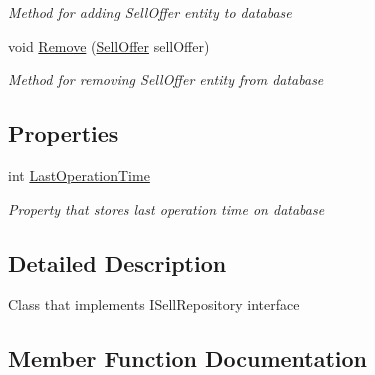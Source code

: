 \begin{DoxyCompactItemize}
\begin{DoxyCompactList}\small\item\em Method for adding Sell\+Offer entity to database \end{DoxyCompactList}\item 
void \mbox{\hyperlink{class_gielda_l2_1_1_i_n_f_r_a_s_t_r_u_c_t_u_r_e_1_1_repositories_1_1_sell_offer_repostory_ad66a43f51403182c2c341f8fcfc77715}{Remove}} (\mbox{\hyperlink{class_gielda_l2_1_1_d_b_1_1_entities_1_1_sell_offer}{Sell\+Offer}} sell\+Offer)
\begin{DoxyCompactList}\small\item\em Method for removing Sell\+Offer entity from database \end{DoxyCompactList}\end{DoxyCompactItemize}
\subsection*{Properties}
\begin{DoxyCompactItemize}
\item 
int \mbox{\hyperlink{class_gielda_l2_1_1_i_n_f_r_a_s_t_r_u_c_t_u_r_e_1_1_repositories_1_1_sell_offer_repostory_af456365d00cc4fcbb2f280ec86dc1a1c}{Last\+Operation\+Time}}
\begin{DoxyCompactList}\small\item\em Property that stores last operation time on database \end{DoxyCompactList}\end{DoxyCompactItemize}


\subsection{Detailed Description}
Class that implements I\+Sell\+Repository interface 



\subsection{Member Function Documentation}
\mbox{\label{class_gielda_l2_1_1_i_n_f_r_a_s_t_r_u_c_t_u_r_e_1_1_repositories_1_1_sell_offer_repostory_a9998a9883c5ae73fb854eeff44075e73}} 
